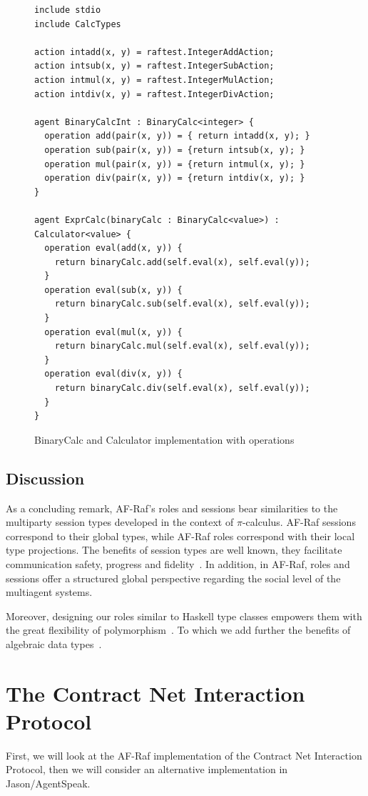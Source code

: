 \documentclass[a4paper,12pt,oneside,fleqn]{book} %
\begin{document}
\begin{figure}\footnotesize %
\begin{verbatim}
include stdio
include CalcTypes

action intadd(x, y) = raftest.IntegerAddAction;
action intsub(x, y) = raftest.IntegerSubAction;
action intmul(x, y) = raftest.IntegerMulAction;
action intdiv(x, y) = raftest.IntegerDivAction;

agent BinaryCalcInt : BinaryCalc<integer> {
  operation add(pair(x, y)) = { return intadd(x, y); }
  operation sub(pair(x, y)) = {return intsub(x, y); }
  operation mul(pair(x, y)) = {return intmul(x, y); }
  operation div(pair(x, y)) = {return intdiv(x, y); }
}

agent ExprCalc(binaryCalc : BinaryCalc<value>) : Calculator<value> {
  operation eval(add(x, y)) {
    return binaryCalc.add(self.eval(x), self.eval(y));
  }
  operation eval(sub(x, y)) {
    return binaryCalc.sub(self.eval(x), self.eval(y));
  }
  operation eval(mul(x, y)) {
    return binaryCalc.mul(self.eval(x), self.eval(y));
  }
  operation eval(div(x, y)) {
    return binaryCalc.div(self.eval(x), self.eval(y));
  }
}
\end{verbatim}
\caption{BinaryCalc and Calculator implementation with operations}
\label{fig:calc-op}
\end{figure} %
\subsection{Discussion} %
As a concluding remark, AF-Raf's roles and sessions bear similarities to the multiparty session types developed in the context of
$\pi$-calculus. AF-Raf sessions correspond to their global types, while
AF-Raf roles correspond with their local type projections. The benefits of
session types are well known, they facilitate communication safety,
progress and fidelity~\cite{dblp:conf/popl/hondayc08}. In addition, in
AF-Raf, roles and sessions offer a structured global perspective regarding
the social level of the multiagent systems.

Moreover, designing our roles similar to Haskell type classes empowers them
with the great flexibility of polymorphism~\cite{DBLP:conf/popl/WadlerB89}.
To which we add further the benefits of algebraic data
types~\cite{DBLP:journals/acta/GuttagH78}.
\section{The Contract Net Interaction Protocol}\label{sc:contractNet} %
First, we will look at the AF-Raf implementation of the Contract Net
Interaction Protocol, then we will consider an alternative implementation
in Jason/AgentSpeak.
\end{document}
